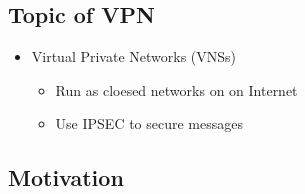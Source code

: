 \documentclass[12pt]{ctexart}   %
\begin{document}
	\subsection{Topic of VPN}
	\begin{itemize}
		\item Virtual Private Networks (VNSs)
		\begin{itemize}
			\item Run as cloesed networks on on Internet
			\item Use IPSEC to secure messages
		\end{itemize}
	\end{itemize}

	\subsection{Motivation}
\end{document}
